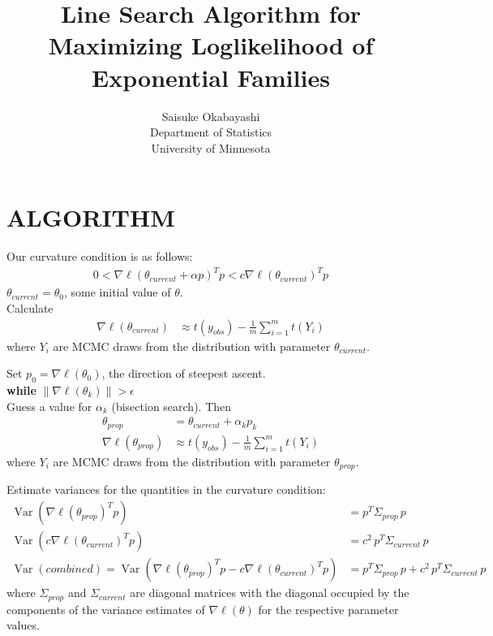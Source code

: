 \documentclass{amsbook}
\title{Line Search Algorithm for Maximizing Loglikelihood of Exponential Families}
\author{Saisuke Okabayashi \\ Department of Statistics \\ University of Minnesota}
\DeclareMathOperator{\Var}{Var}
\theoremstyle{definition}
\theoremstyle{remark}
\begin{document}
\maketitle

\section{ALGORITHM} 
Our curvature condition is as follows:
\begin{align*}
	0 < \nabla \ell( \theta_{current} + \alpha p ) ^T p < c \nabla \ell( \theta_
{current}) ^T p
\end{align*}
$\theta_{current} = \theta_0$, some initial value of $\theta$.\\ 
Calculate
\begin{align*}
	\nabla \ell( \theta_{current} ) &\approx t( y_{obs}) - \frac{1}{m} \sum_{i=1}^m t
( Y_i)
\end{align*}
where $Y_i$ are MCMC draws from the distribution with parameter $\theta_{current}$.

\noindent Set $p_0 = \nabla \ell( \theta_0)$, the direction of steepest ascent. \\

\noindent \textbf{while}  $\parallel \nabla \ell( \theta_k) \parallel > \epsilon$ \\ 
\hspace{4mm} 
\indent Guess a value for $\alpha_k$ (bisection search).  Then
\begin{align*}
	\theta_{prop} &= \theta_{current} + \alpha_k p_k \\
	\nabla \ell( \theta_{prop} ) &\approx t( y_{obs}) - \frac{1}{m} \sum_{i=1}^m t
( Y_i)
\end{align*}
\indent where $Y_i$ are MCMC draws from the distribution with parameter $\theta_
{prop}$.

\indent Estimate variances for the quantities in the curvature condition:
\begin{align*}
	\Var \left( \nabla \ell(\theta_{prop})^T p \right ) &= p^T \Sigma_{prop} \, p \\
	\Var \left( c \nabla \ell(\theta_{current})^T p \right ) &= c^2 \,p^T \Sigma_
{current} \, p \\
	\Var(combined) = \Var \left( \nabla \ell(\theta_{prop})^T p - c \nabla \ell
(\theta_{current})^T p \right ) &=  p^T \Sigma_{prop} \, p + c^2 \, p^T \Sigma_
{current} \, p 
\end{align*}
where $\Sigma_{prop}$ and $\Sigma_{current}$ are diagonal matrices with the diagonal 
occupied by the components of the variance estimates of $\nabla \ell(\theta )$ for 
the respective parameter values. \\
\end{document}
